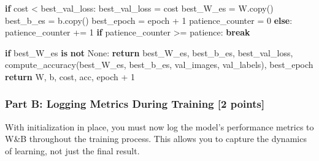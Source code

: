 \documentclass[
  letterpaper,
  DIV=11,
  numbers=noendperiod]{scrartcl}
\newenvironment{Shaded}{\begin{snugshade}}{\end{snugshade}}
\newcommand{\ControlFlowTok}[1]{\textcolor[rgb]{0.00,0.23,0.31}{\textbf{#1}}}
\newcommand{\DecValTok}[1]{\textcolor[rgb]{0.68,0.00,0.00}{#1}}
\newcommand{\KeywordTok}[1]{\textcolor[rgb]{0.00,0.23,0.31}{\textbf{#1}}}
\newcommand{\NormalTok}[1]{\textcolor[rgb]{0.00,0.23,0.31}{#1}}
\newcommand{\OperatorTok}[1]{\textcolor[rgb]{0.37,0.37,0.37}{#1}}
\newcommand{\VariableTok}[1]{\textcolor[rgb]{0.07,0.07,0.07}{#1}}
\begin{document}
\begin{Shaded}
\begin{Highlighting}[]
        \ControlFlowTok{if}\NormalTok{ cost }\OperatorTok{\textless{}}\NormalTok{ best\_val\_loss:}
\NormalTok{            best\_val\_loss }\OperatorTok{=}\NormalTok{ cost}
\NormalTok{            best\_W\_es }\OperatorTok{=}\NormalTok{ W.copy()}
\NormalTok{            best\_b\_es }\OperatorTok{=}\NormalTok{ b.copy()}
\NormalTok{            best\_epoch }\OperatorTok{=}\NormalTok{ epoch }\OperatorTok{+} \DecValTok{1}
\NormalTok{            patience\_counter }\OperatorTok{=} \DecValTok{0}
        \ControlFlowTok{else}\NormalTok{:}
\NormalTok{            patience\_counter }\OperatorTok{+=} \DecValTok{1}
            \ControlFlowTok{if}\NormalTok{ patience\_counter }\OperatorTok{\textgreater{}=}\NormalTok{ patience:}
                \ControlFlowTok{break}

    \ControlFlowTok{if}\NormalTok{ best\_W\_es }\KeywordTok{is} \KeywordTok{not} \VariableTok{None}\NormalTok{:}
        \ControlFlowTok{return}\NormalTok{ best\_W\_es, best\_b\_es, best\_val\_loss, compute\_accuracy(best\_W\_es, best\_b\_es, val\_images, val\_labels), best\_epoch}
    \ControlFlowTok{return}\NormalTok{ W, b, cost, acc, epoch }\OperatorTok{+} \DecValTok{1}
\end{Highlighting}
\end{Shaded}

\subsubsection{Part B: Logging Metrics During Training {[}2
points{]}}\label{part-b-logging-metrics-during-training-2-points}

With initialization in place, you must now log the model's performance
metrics to W\&B throughout the training process. This allows you to
capture the dynamics of learning, not just the final result.
\end{document}
